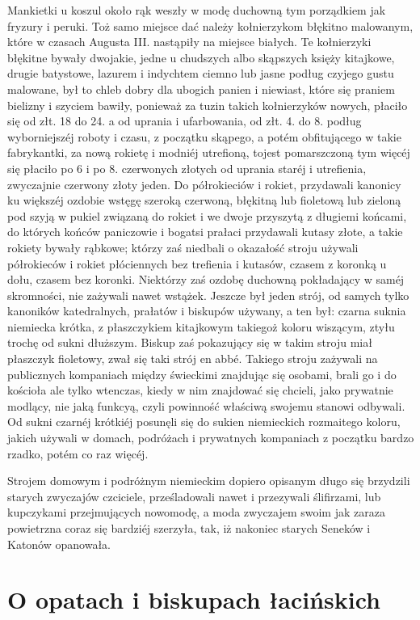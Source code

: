 \documentclass{book}
\begin{document}
Mankietki u koszul około rąk weszły w modę duchowną tym porządkiem jak fryzury i peruki. Toż samo miejsce dać należy kołnierzykom błękitno malowanym, które w czasach Augusta III. nastąpiły na miejsce białych. Te kołnierzyki błękitne bywały dwojakie, jedne u chudszych albo skąpszych księży kitajkowe, drugie batystowe, lazurem i indychtem ciemno lub jasne podług czyjego gustu malowane, był to chleb dobry dla ubogich panien i niewiast, które się praniem bielizny i szyciem bawiły, ponieważ za tuzin takich kołnierzyków nowych, płaciło się od złt. 18 do 24. a od uprania i ufarbowania, od złt. 4. do 8. podług wyborniejszéj roboty i czasu, z początku skąpego, a potém obfitującego w takie fabrykantki, za nową rokietę i modniéj utrefioną, tojest pomarszczoną tym więcéj się płaciło po 6 i po 8. czerwonych złotych od uprania staréj i utrefienia, zwyczajnie czerwony złoty jeden. Do półrokieciów i rokiet, przydawali kanonicy ku większéj ozdobie wstęgę szeroką czerwoną, błękitną lub fioletową lub zieloną pod szyją w pukiel związaną do rokiet i we dwoje przyszytą z długiemi końcami, do których końców paniczowie i bogatsi prałaci przydawali kutasy złote, a takie rokiety bywały rąbkowe; którzy zaś niedbali o okazałość stroju używali półrokieców i rokiet płóciennych bez trefienia i kutasów, czasem z koronką u dołu, czasem bez koronki. Niektórzy zaś ozdobę duchowną pokładający w saméj skromności, nie zażywali nawet wstążek. Jeszcze był jeden strój, od samych tylko kanoników katedralnych, prałatów i biskupów używany, a ten był: czarna suknia niemiecka krótka, z płaszczykiem kitajkowym takiegoż koloru wiszącym, ztyłu trochę od sukni dłuższym. Biskup zaś pokazujący się w takim stroju miał płaszczyk fioletowy, zwał się taki strój en abbé. Takiego stroju zażywali na publicznych kompaniach między świeckimi znajdując się osobami, brali go i do kościoła ale tylko wtenczas, kiedy w nim znajdować się chcieli, jako prywatnie modlący, nie jaką funkcyą, czyli powinność właściwą swojemu stanowi odbywali. Od sukni czarnéj krótkiéj posunęli się do sukien niemieckich rozmaitego koloru, jakich używali w domach, podróżach i prywatnych kompaniach z początku bardzo rzadko, potém co raz więcéj.

Strojem domowym i podróżnym niemieckim dopiero opisanym długo się brzydzili starych zwyczajów czciciele, prześladowali nawet i przezywali ślifirzami, lub kupczykami przejmujących nowomodę, a moda zwyczajem swoim jak zaraza powietrzna coraz się bardziéj szerzyła, tak, iż nakoniec starych Seneków i Katonów opanowała.

\section{O opatach i biskupach łacińskich}
\end{document}
